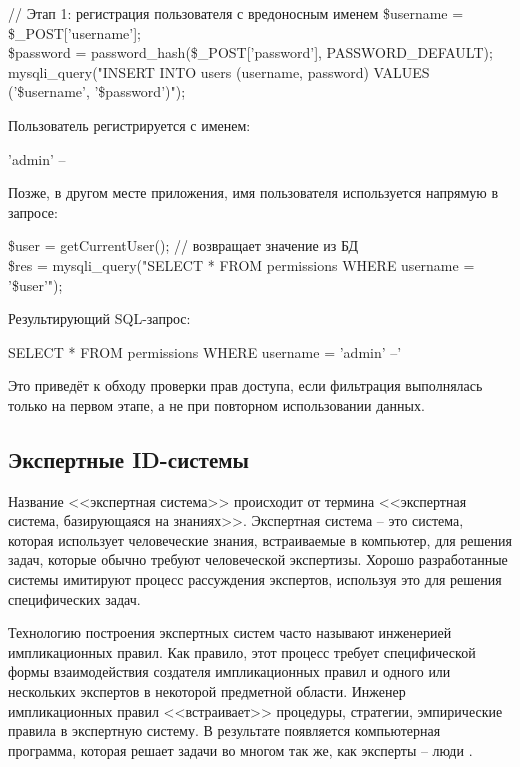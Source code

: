 \begin{itemize}
	\begin{grayquote}
		// Этап 1: регистрация пользователя с вредоносным именем
		\$username = \$\_POST['username'];\\
		\$password = password\_hash(\$\_POST['password'], PASSWORD\_DEFAULT);\\
		mysqli\_query("INSERT INTO users (username, password) VALUES ('\$username', '\$password')");
	\end{grayquote}

	Пользователь регистрируется с именем:
	\begin{grayquote}
		'admin' -- 
	\end{grayquote}

	Позже, в другом месте приложения, имя пользователя используется напрямую в запросе:

	\begin{grayquote}
		\$user = getCurrentUser(); // возвращает значение из БД\\
		\$res = mysqli\_query("SELECT * FROM permissions WHERE username = '\$user'");
	\end{grayquote}

	Результирующий SQL-запрос:

	\begin{grayquote}
		SELECT * FROM permissions WHERE username = 'admin' --'
	\end{grayquote}

	Это приведёт к обходу проверки прав доступа, если фильтрация выполнялась только на первом этапе, а не при повторном использовании данных.
		
    
\end{itemize}


\subsection{Экспертные ID-системы}

Название <<экспертная система>> происходит от термина <<экспертная система, базирующаяся на знаниях>>. Экспертная система – это система, которая использует человеческие знания, встраиваемые в компьютер, для решения задач, которые обычно требуют человеческой экспертизы. Хорошо разработанные системы имитируют процесс рассуждения экспертов, используя это для решения специфических задач.

Технологию построения экспертных систем часто называют инженерией импликационных правил. Как правило,
этот процесс требует специфической формы взаимодействия создателя импликационных правил и одного
или нескольких экспертов в некоторой предметной области. Инженер импликационных правил <<встраивает>>
процедуры, стратегии, эмпирические правила в экспертную систему. В результате появляется
компьютерная программа, которая решает задачи во многом так же, как эксперты -- люди \autocite{IDSystem}.

